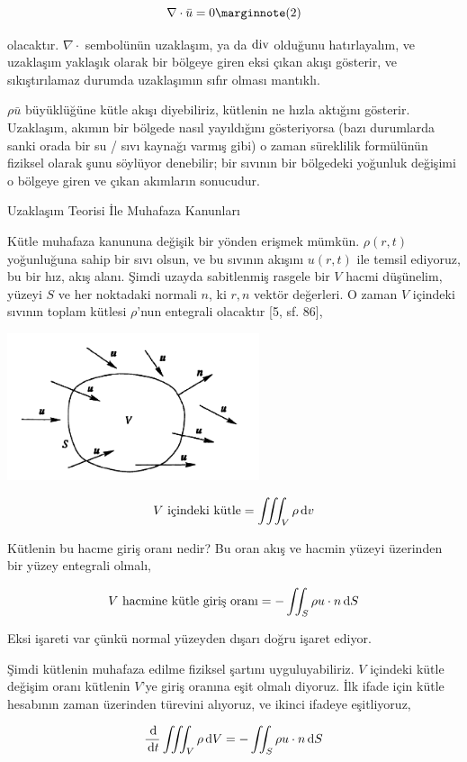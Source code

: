 \documentclass[12pt,fleqn]{article}\usepackage{../../common}
\begin{document}
$$
\nabla \cdot \bar{u} = 0
\mlabel{2}
$$

olacaktır. $\nabla \cdot$ sembolünün uzaklaşım, ya da $\operatorname{div}$ olduğunu
hatırlayalım, ve uzaklaşım yaklaşık olarak bir bölgeye giren eksi çıkan akışı
gösterir, ve sıkıştırılamaz durumda uzaklaşımın sıfır olması mantıklı.

$\rho \bar{u}$ büyüklüğüne kütle akışı diyebiliriz, kütlenin ne hızla aktığını
gösterir. Uzaklaşım, akımın bir bölgede nasıl yayıldığını gösteriyorsa (bazı
durumlarda sanki orada bir su / sıvı kaynağı varmış gibi) o zaman süreklilik
formülünün fiziksel olarak şunu söylüyor denebilir; bir sıvının bir bölgedeki
yoğunluk değişimi o bölgeye giren ve çıkan akımların sonucudur.

Uzaklaşım Teorisi İle Muhafaza Kanunları

Kütle muhafaza kanununa değişik bir yönden erişmek mümkün. $\rho(r, t)$
yoğunluğuna sahip bir sıvı olsun, ve bu sıvının akışını $u(r, t)$ ile temsil
ediyoruz, bu bir hız, akış alanı. Şimdi uzayda sabitlenmiş rasgele bir $V$ hacmi
düşünelim, yüzeyi $S$ ve her noktadaki normali $n$, ki $r,n$ vektör değerleri. O
zaman $V$ içindeki sıvının toplam kütlesi $\rho$'nun entegrali olacaktır [5, sf. 86],

\includegraphics[width=20em]{phy_050_cons_01.png}

$$
V \textrm{ içindeki kütle} = \iiint_V \rho \,\mathrm{d} v
$$

Kütlenin bu hacme giriş oranı nedir? Bu oran akış ve hacmin yüzeyi üzerinden bir
yüzey entegrali olmalı,

$$
V \textrm{ hacmine kütle giriş oranı} = - \iint_S \rho u \cdot n \,\mathrm{d} S
$$

Eksi işareti var çünkü normal yüzeyden dışarı doğru işaret ediyor.

Şimdi kütlenin muhafaza edilme fiziksel şartını uyguluyabiliriz. $V$ içindeki
kütle değişim oranı kütlenin $V$'ye giriş oranına eşit olmalı diyoruz. İlk ifade
için kütle hesabının zaman üzerinden türevini alıyoruz, ve ikinci ifadeye
eşitliyoruz,

$$
\frac{\,\mathrm{d}}{\,\mathrm{d} t}  \iiint_V \rho \,\mathrm{d} V = - \iint_S \rho u \cdot n \,\mathrm{d} S
$$
\end{document}
